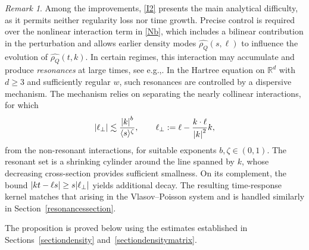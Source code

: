 \documentclass[11pt]{article}
\newcommand{\eg}{e.g.,\xspace}
\theoremstyle{plain}
\theoremstyle{remark}
\newtheorem{remark}[theorem]{Remark}
\newcommand{\ak}{\abs{k}}
\newcommand{\jb}[1]{\langle#1\rangle}
\newcommand{\R}{\mathbb{R}}
\begin{document}
\begin{remark}
Among the improvements, \eqref{I2} presents the main analytical difficulty, as it permits neither regularity loss nor time growth. Precise control is required over the nonlinear interaction term in \eqref{Nb}, which includes a bilinear contribution in the perturbation and allows earlier density modes $\widehat{\rho_Q}(s,\ell)$ to influence the evolution of $\widehat{\rho_Q}(t,k)$. In certain regimes, this interaction may accumulate and produce \textit{resonances} at large times, see \eg \cite{Bedrossian2021Echoes}. In the Hartree equation on $\R^d$ with $d\geq 3$ and sufficiently regular $w$, such resonances are controlled by a dispersive mechanism. The mechanism relies on separating the nearly collinear interactions, for which
\begin{align*}
\abs{\ell_\perp}\lesssim\frac{\ak^{b}}{\jb{s}^{\zeta}},\qquad \ell_\perp:=\ell-\frac{k\cdot\ell}{\ak^2}k,
\end{align*}
from the non-resonant interactions, for suitable exponents $b,\zeta\in(0,1)$. The resonant set is a shrinking cylinder around the line spanned by $k$, whose decreasing cross-section provides sufficient smallness. On its complement, the bound $\abs{kt-\ell s}\geq s\abs{\ell_\perp}$ yields additional decay. The resulting time-response kernel matches that arising in the Vlasov--Poisson system and is handled similarly in Section~\ref{resonancessection}.
\end{remark}

The proposition is proved below using the estimates established in Sections~\ref{sectiondensity} and~\ref{sectiondensitymatrix}.
\end{document}
